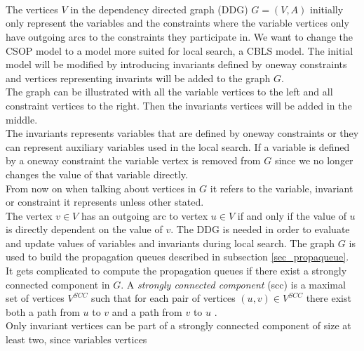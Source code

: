  \\ 
 \\
 \\
The vertices $V$ in the dependency directed graph (DDG) $G=(V,A)$ initially only represent the variables and the 
constraints where the variable vertices only have outgoing arcs to the constraints they participate in. We want to 
change the CSOP model to a model more suited for local search, a CBLS model. The initial model will be modified by 
introducing invariants defined by oneway constraints and vertices representing invarints will be added to the graph 
$G$.  \\
The graph can be illustrated with all the variable vertices to the left and all constraint vertices to the right. 
Then the invariants vertices will be added in the middle. \\  
The invariants represents variables that are defined by oneway constraints or they can represent 
auxiliary variables used in the local search. If a variable is defined by a oneway constraint the variable vertex is 
removed from $G$ since we no longer changes the value of that variable directly.  \\ 
From now on when talking about vertices in $G$ it refers to the variable, invariant or constraint it represents unless 
other stated. \\
The vertex $v \in V$ has an outgoing arc to vertex $u \in V$ if and only if the value of $u$ is directly dependent on 
the value of $v$.
The DDG is needed in order to evaluate and update values of variables and invariants during local search. The graph 
$G$ is used to build the propagation queues described in subsection \ref{sec_propaqueue}. \\ 
It gets complicated to compute the propagation queues if there exist a strongly connected component in $G$. A 
\emph{strongly connected component} (scc) is a maximal set of vertices $V^{SCC}$ such that for each pair of vertices 
$(u,v) \in V^{SCC}$ there exist both a path from $u$ to $v$ and a path from $v$ to $u$ \cite[p. 1170]{cormen}. \\ 
Only invariant vertices can be part of a strongly connected component of size at least two, since variables vertices 
